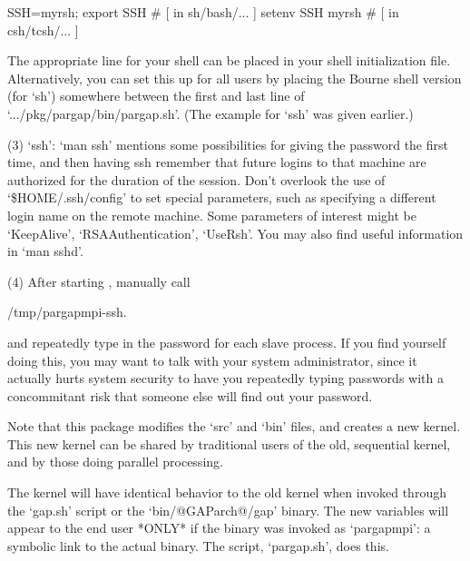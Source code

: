 \begintt
SSH=myrsh; export SSH  # [ in sh/bash/... ]
setenv SSH myrsh       # [ in csh/tcsh/... ]
\endtt

\item{}
    The appropriate line for your shell  can  be  placed  in  your  shell
    initialization file. Alternatively, you can set this up for all users
    by placing the Bourne shell version (for `sh') somewhere between  the
    first and last line of `.../pkg/pargap/bin/pargap.sh'.  (The  example
    for `ssh' was given earlier.)

\item{(3)}
    `ssh': `man ssh' mentions some possibilities for giving the  password
    the first time, and then having ssh remember that  future  logins  to
    that machine are authorized for the duration of  the  session.  Don't
    overlook the use of `\$HOME/.ssh/config' to set  special  parameters,
    such as specifying a different login name on the remote machine. Some
    parameters of interest  might  be  `KeepAlive',  `RSAAuthentication',
    `UseRsh'. You may also find useful information in `man sshd'.

\item{(4)}
     After starting {\ParGAP}, manually call

\begintt
/tmp/pargapmpi-ssh.$$
\endtt

\item{}
    and repeatedly type in the password for each slave  process.  If  you
    find yourself doing this, you may  want  to  talk  with  your  system
    administrator, since it actually hurts system security  to  have  you
    repeatedly typing passwords with a  concommitant  risk  that  someone
    else will find out your password.

\endlist




Note that this package modifies the {\GAP} `src'  and  `bin'  files,  and
creates a new {\GAP} kernel. This new {\GAP}  kernel  can  be  shared  by
traditional users of the old, sequential  {\GAP}  kernel,  and  by  those
doing parallel processing.

The {\GAP} kernel will have identical behavior to the old  {\GAP}  kernel
when invoked through  the  `gap.sh'  script  or  the  `bin/@GAParch@/gap'
binary. The new {\ParGAP} variables will appear to the end user *ONLY* if
the {\GAP} binary was invoked as `pargapmpi':  a  symbolic  link  to  the
actual {\GAP} binary. The script, `pargap.sh', does this.

